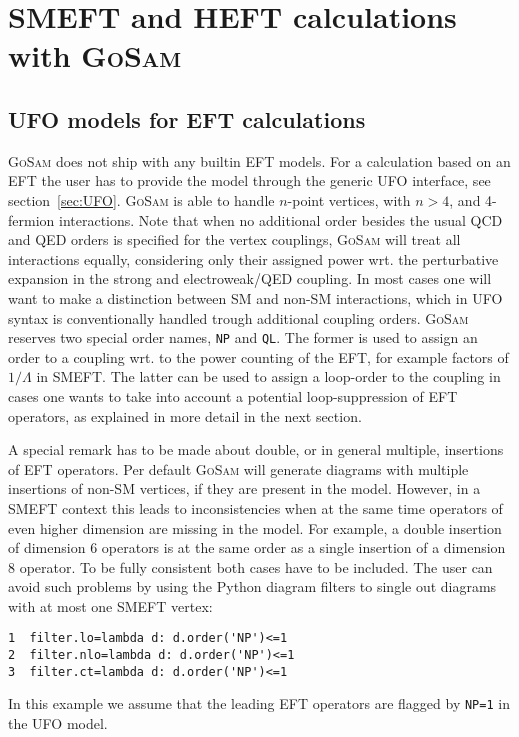 \documentclass[11pt,a4paper]{refrep}
\newcommand{\gosam}{\textsc{GoSam}\xspace}
\newcommand{\python}{{Python}\xspace}
\begin{document}


\chapter{SMEFT and HEFT calculations with \gosam}
\label{sec:EFT}

\section{UFO models for EFT calculations}
\gosam does not ship with any builtin EFT models. For a calculation based on an EFT the user has to provide the model through the generic UFO interface, see section~\ref{sec:UFO}. \gosam is able to handle $n$-point vertices, with $n>4$, and 4-fermion interactions. Note that when no additional order besides the usual QCD and QED orders is specified for the vertex couplings, \gosam will treat all interactions equally, considering only their assigned power wrt. the perturbative expansion in the strong and electroweak/QED coupling. In most cases one will want to make a distinction between SM and non-SM interactions, which in UFO syntax is conventionally handled trough additional coupling orders. \gosam reserves two special order names, \texttt{NP} and \texttt{QL}. The former is used to assign an order to a coupling wrt. to the power counting of the EFT, for example factors of $1/\Lambda$ in SMEFT. The latter can be used to assign a loop-order to the coupling in cases one wants to take into account a potential loop-suppression of EFT operators, as explained in more detail in the next section.

A special remark has to be made about double, or in general multiple, insertions of EFT operators. Per default \gosam will generate diagrams with multiple insertions of non-SM vertices, if they are present in the model. However, in a SMEFT context this leads to inconsistencies when at the same time operators of even higher dimension are missing in the model. For example, a double insertion of dimension 6 operators is at the same order as a single insertion of a dimension 8 operator. To be fully consistent both cases have to be included. The user can avoid such problems by using the \python diagram filters to single out diagrams with at most one SMEFT vertex:
\begin{lstlisting}[gobble=3,style=py]
1  filter.lo=lambda d: d.order('NP')<=1
2  filter.nlo=lambda d: d.order('NP')<=1
3  filter.ct=lambda d: d.order('NP')<=1
\end{lstlisting}
In this example we assume that the leading EFT operators are flagged by \texttt{NP=1} in the UFO model.
\end{document}
